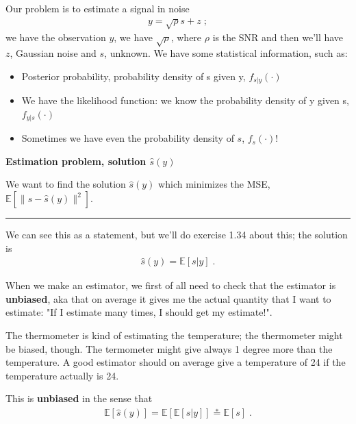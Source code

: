 \documentclass[a4paper, 12pt]{book}
\begin{document}
Our problem is to estimate a signal in noise
\begin{align*}
y = \sqrt{\rho}s + z \;;
\end{align*}
we have the observation $y$, we have $\sqrt{\rho}$, where $\rho$ is the SNR and then we'll have $z$, Gaussian noise and $s$, unknown.
We have some statistical information, such as:
\begin{itemize}
    \item Posterior probability, probability density of s given y, $f_{s|y}(\cdot)$
    \item We have the likelihood function: we know the probability density of y given s, $f_{y|s}(\cdot)$
    \item Sometimes we have even the probability density of $s$, $f_s(\cdot)$!
\end{itemize}

\begin{tcolorbox}[colframe=cyan!80!blue, colback=white, boxrule=1pt, arc=2pt]
    \textcolor{cyan!80!blue}{\textbf{Estimation problem, solution $\hat{s}(y)$}}

    We want to find the solution $\hat{s}(y)$ which minimizes the MSE, $\mathbb{E}[\|s - \hat{s}(y)\|^2]$.
    
    \vspace{0.5em}
    \hrule
    \vspace{0.5em}
    
    We can see this as a statement, but we'll do exercise 1.34 about this; the solution is
    \begin{align}
    \hat{s}(y) = \mathbb{E}[s|y] \;. \tag{1.151}
    \end{align}
\end{tcolorbox}

\vspace{1em}

When we make an estimator, we first of all need to check that the estimator is \textbf{unbiased}, aka that on average it gives me the actual quantity that I want to estimate: "If I estimate many times, I should get my estimate!".

The thermometer is kind of estimating the temperature; the thermometer might be biased, though. The termometer might give always 1 degree more than the temperature.
A good estimator should on average give a temperature of 24 if the temperature actually is 24.

This is \textbf{unbiased} in the sense that
\begin{align}
\mathbb{E}[\hat{s}(y)] = \mathbb{E}[\mathbb{E}[s|y]] \stackrel{*}{=} \mathbb{E}[s] \;. \tag{1.153}
\end{align}
\end{document}
